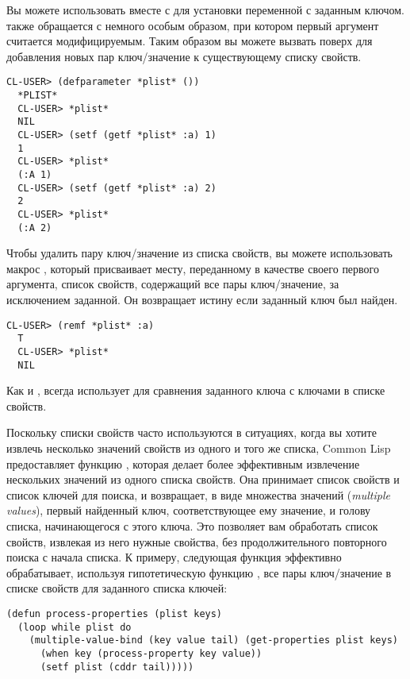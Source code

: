 Вы можете использовать  вместе с  для установки переменной с
заданным ключом.  также обращается с  немного особым образом, при
котором первый аргумент  считается модифицируемым. Таким образом вы можете
вызвать  поверх  для добавления новых пар ключ/значение к
существующему списку свойств.
  
\begin{lstlisting}[style=lisprepl]
  CL-USER> (defparameter *plist* ())
  *PLIST*
  CL-USER> *plist*
  NIL
  CL-USER> (setf (getf *plist* :a) 1)
  1
  CL-USER> *plist*
  (:A 1)
  CL-USER> (setf (getf *plist* :a) 2)
  2
  CL-USER> *plist*
  (:A 2)
\end{lstlisting}

Чтобы удалить пару ключ/значение из списка свойств, вы можете использовать макрос
, который присваивает месту, переданному в качестве своего первого аргумента,
список свойств, содержащий все пары ключ/значение, за исключением заданной. Он возвращает
истину если заданный ключ был найден.
  
\begin{lstlisting}[style=lisprepl]
  CL-USER> (remf *plist* :a)
  T
  CL-USER> *plist*
  NIL
\end{lstlisting}

Как и ,  всегда использует  для сравнения заданного ключа с
ключами в списке свойств.

Поскольку списки свойств часто используются в ситуациях, когда вы хотите извлечь несколько
значений свойств из одного и того же списка, Common Lisp предоставляет функцию
, которая делает более эффективным извлечение нескольких значений из
одного списка свойств. Она принимает список свойств и список ключей для поиска, и
возвращает, в виде множества значений (\textit{multiple values}), первый найденный ключ,
соответствующее ему значение, и голову списка, начинающегося с этого ключа. Это позволяет
вам обработать список свойств, извлекая из него нужные свойства, без продолжительного
повторного поиска с начала списка.  К примеру, следующая функция эффективно обрабатывает,
используя гипотетическую функцию , все пары ключ/значение в списке
свойств для заданного списка ключей:

\begin{lstlisting}
(defun process-properties (plist keys)
  (loop while plist do
	(multiple-value-bind (key value tail) (get-properties plist keys)
	  (when key (process-property key value))
	  (setf plist (cddr tail)))))
\end{lstlisting}

